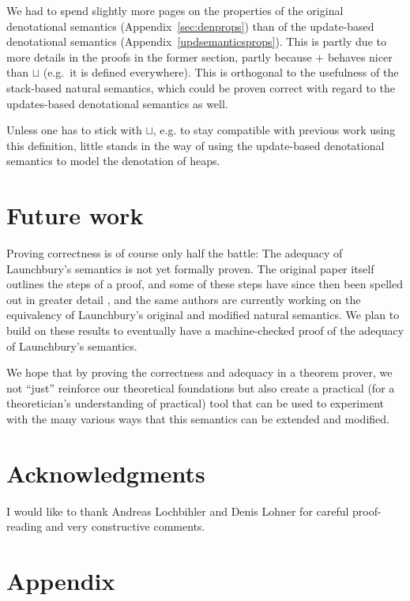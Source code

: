 \documentclass{scrartcl}
\theoremstyle{nonumberbreak}
\begin{document}
We had to spend slightly more pages on the properties of the original denotational semantics (Appendix~\ref{sec:denprops}) than of the update-based denotational semantics (Appendix~\ref{updsemanticsprops}). This is partly due to more details in the proofs in the former section, partly because $+$ behaves nicer than $\sqcup$ (e.g.\ it is defined everywhere). This is orthogonal to the usefulness of the stack-based natural semantics, which could be proven correct with regard to the updates-based denotational semantics as well.

Unless one has to stick with $\sqcup$, e.g. to stay compatible with previous work using this definition, little stands in the way of using the update-based denotational semantics to model the denotation of heaps.

\section{Future work}

Proving correctness is of course only half the battle: The adequacy of Launchbury’s semantics is not yet formally proven. The original paper itself outlines the steps of a proof, and some of these steps have since then been spelled out in greater detail \cite{functionspaces}, and the same authors are currently working on the equivalency of Launchbury’s original and modified natural semantics. We plan to build on these results to eventually have a machine-checked proof of the adequacy of Launchbury’s semantics.

We hope that by proving the correctness and adequacy in a theorem prover, we not “just” reinforce our theoretical foundations but also create a practical (for a theoretician’s understanding of practical) tool that can be used to experiment with the many various ways that this semantics can be extended and modified.

\section*{Acknowledgments}

I would like to thank Andreas Lochbihler and Denis Lohner for careful proof-reading and very constructive comments.




\appendix


\section{Appendix}
\end{document}
